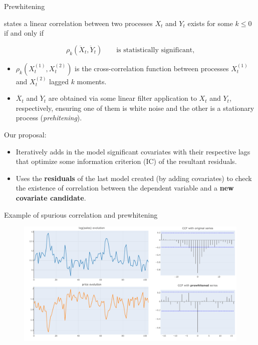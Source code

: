 \documentclass[10pt]{beamer}
\begin{document}
\begin{frame}{Prewhitening}

    \cite{cryer2008time} states a linear correlation between two processes $X_t$ and $Y_t$ exists for some $k\leq 0$ if and only if 
    
    \[ \rho_k(\ddot{X}_t, \ddot{Y}_t) \qquad \text{is statistically significant,} \] 

    \begin{itemize}
        \item $\rho_k(X_t^{(1)}, X_t^{(2)})$ is the cross-correlation function between processes $X_t^{(1)}$ and $X_t^{(2)}$ lagged $k$ moments.
        \item $\ddot{X_t}$ and $\ddot{Y}_t$ are obtained via some linear filter application to $X_t$ and $Y_t$, respectively, ensuring one of them is white noise and the other is a stationary process (\textit{prehitening}).
    \end{itemize}

    \begin{block}{}
        Our proposal:
        \begin{itemize}
            \item Iteratively adds in the model significant covariates with their respective lags that optimize some information criterion (IC) of the resultant residuals.
            \item Uses the \textbf{residuals} of the last model created (by adding covariates) to check the existence of correlation between the dependent variable and a \textbf{new covariate candidate}.
        \end{itemize}
    \end{block}

\end{frame}

\begin{frame}{Example of spurious correlation and prewhitening}
    \begin{figure}
        \includegraphics[scale=0.35]{example prewhitening.pdf}
    \end{figure}
    
\end{frame}
\end{document}
